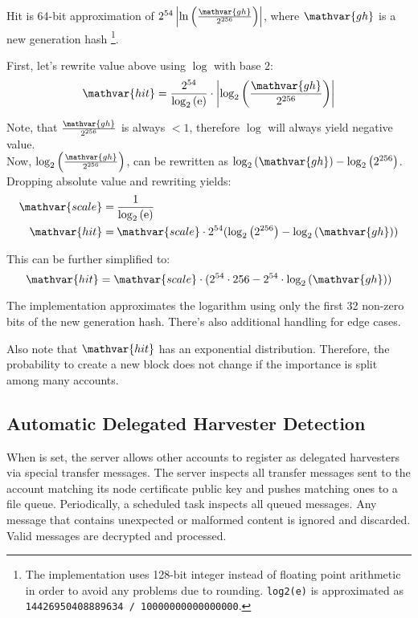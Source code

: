Hit is 64-bit approximation of $2^{54} \left|\ln\left(\frac{\mathvar{gh}}{2^{256}}\right)\right|$, where $\mathvar{gh}$ is a new generation hash
\footnote{
	The implementation uses 128-bit integer instead of floating point arithmetic in order to avoid any problems due to rounding.
	\texttt{log2(e)} is approximated as \texttt{14426950408889634 / 10000000000000000}.
}.

First, let's rewrite value above using $\log$ with base $2$:
$$
\mathvar{hit} = \frac{2^{54}}{\log_2\left(\euler\right)} \cdot \left|\log_2\left(\frac{\mathvar{gh}}{2^{256}}\right)\right|
$$

Note, that $\frac{\mathvar{gh}}{2^{256}}$ is always $< 1$, therefore $\log$ will always yield negative value. \\
Now, $\log_2\left(\frac{\mathvar{gh}}{2^{256}}\right)$, can be rewritten as $\log_2\left(\mathvar{gh}\right) - \log_2\left(2^{256}\right)$. \\

Dropping absolute value and rewriting yields:
\begin{align*}
	\mathvar{scale} = \: & \frac{1}{\log_2\left(\euler\right)} \\
	\mathvar{hit} = \: & \mathvar{scale} \cdot 2^{54} (\log_2\left(2^{256}\right) - \log_2\left(\mathvar{gh}\right))
\end{align*}

This can be further simplified to:
$$
\mathvar{hit} =  \mathvar{scale} \cdot ( 2^{54} \cdot 256 -  2^{54} \cdot \log_2\left(\mathvar{gh}\right))
$$

The implementation approximates the logarithm using only the first 32 non-zero bits of the new generation hash.
There's also additional handling for edge cases.

Also note that $\mathvar{hit}$ has an exponential distribution. Therefore, the probability to create a new block does not change if the importance is split among many accounts.

\subsection{Automatic Delegated Harvester Detection}
\label{sec:blockchain:delegatedHarvesterDetection}

When  is set, the server allows other accounts to register as delegated harvesters via special transfer messages.
The server inspects all transfer messages sent to the account matching its node certificate public key and pushes matching ones to a file queue.
Periodically, a scheduled task inspects all queued messages.
Any message that contains unexpected or malformed content is ignored and discarded.
Valid messages are decrypted and processed.

